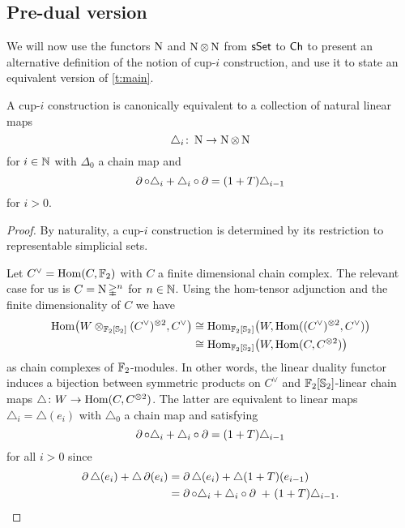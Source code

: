
\subsection{Pre-dual version}

We will now use the functors $\operatorname{N}$ and $\operatorname{N} \otimes \operatorname{N}$ from $\mathsf{sSet}$ to $\mathsf{Ch}$ to present an alternative definition of the notion of cup-$i$ construction, and use it to state an equivalent version of \cref{t:main}.

\begin{lemma} \label{l:cup-i construction coalgebra}
	A cup-$i$ construction is canonically equivalent to a collection of natural linear maps
	\[
	\triangle_i \colon \operatorname{N} \to \operatorname{N} \otimes \operatorname{N}
	\]
	for $i \in \mathbb{N}$ with $\Delta_0$ a chain map and
	\[
	\operatorname{\partial} \circ \triangle_i + \triangle_i \circ \operatorname{\partial} =
	(1+T) \triangle_{i-1}
	\]
	for $i > 0$.
\end{lemma}

\begin{proof}
	By naturality, a cup-$i$ construction is determined by its restriction to representable simplicial sets.

	Let $C^\vee = \mathrm{Hom}(C, {\mathbb{F}_2})$ with $C$ a finite dimensional chain complex.
	The relevant case for us is $C = \operatorname{N} \mathbb{\Delta}^n$ for $n \in \mathbb{N}$.
	Using the hom-tensor adjunction and the finite dimensionality of $C$ we have
	\begin{align*}
	\mathrm{Hom} \big(W \otimes_{{\mathbb{F}_2}[\mathbb{S}_2]} (C^\vee)^{\otimes 2}, C^\vee \big) & \cong
	\mathrm{Hom}_{{\mathbb{F}_2}[\mathbb{S}_2]} \big( W, \mathrm{Hom}((C^\vee)^{\otimes 2}, C^\vee) \big) \\ & \cong
	\mathrm{Hom}_{{\mathbb{F}_2}[\mathbb{S}_2]} \big( W, \mathrm{Hom}(C, C^{\otimes 2}) \big)
	\end{align*}
	as chain complexes of ${\mathbb{F}_2}$-modules.
	In other words, the linear duality functor induces a bijection between symmetric products on $C^\vee$ and ${\mathbb{F}_2}[\mathbb{S}_2]$-linear chain maps $\triangle \colon W \to \mathrm{Hom}(C, C^{\otimes 2})$.
	The latter are equivalent to linear maps $\triangle_i = \triangle(e_i)$ with $\triangle_0$ a chain map and satisfying
	\[
	\operatorname{\partial} \circ \triangle_i + \triangle_i \circ \operatorname{\partial} =
	(1+T) \triangle_{i-1}
	\]
	for all $i > 0$ since
	\begin{align*}
	\operatorname{\partial} \triangle (e_i) + \triangle \operatorname{\partial}(e_i) &=
	\operatorname{\partial} \triangle (e_i) + \triangle (1+T) (e_{i-1}) \\ &=
	\operatorname{\partial} \circ \triangle_i + \triangle_i \circ \operatorname{\partial} \ +\ (1+T) \triangle_{i-1}.
	\end{align*}
\end{proof}

